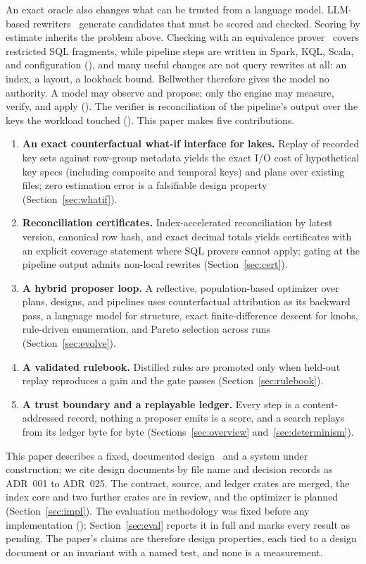 An exact oracle also changes what can be trusted from a language model.
LLM-based rewriters~\cite{genrewrite,llmr2,lithe,quite,e3rewrite,resequel}
generate candidates that must be scored and checked. Scoring by estimate
inherits the problem above. Checking with an equivalence
prover~\cite{cosette,qed,sqlsolver,verieql} covers restricted SQL fragments,
while pipeline steps are written in Spark, KQL, Scala, and configuration
(), and many useful changes are not query rewrites at all: an index, a
layout, a lookback bound. Bellwether therefore gives the model no authority. A
model may observe and propose; only the engine may measure, verify, and apply
(). The verifier is reconciliation of the pipeline's output over the
keys the workload touched (). This paper makes five contributions.

\begin{enumerate}[leftmargin=*,label=\textbf{C\arabic*}]
  \item \textbf{An exact counterfactual what-if interface for lakes.} Replay
    of recorded key sets against row-group metadata yields the exact I/O cost of
    hypothetical key specs (including composite and temporal keys) and plans
    over existing files; zero estimation error is a falsifiable design property
    (Section~\ref{sec:whatif}).
  \item \textbf{Reconciliation certificates.} Index-accelerated reconciliation
    by latest version, canonical row hash, and exact decimal totals yields
    certificates with an explicit coverage statement where SQL provers cannot
    apply; gating at the pipeline output admits non-local rewrites
    (Section~\ref{sec:cert}).
  \item \textbf{A hybrid proposer loop.} A reflective, population-based
    optimizer over plans, designs, and pipelines uses counterfactual attribution
    as its backward pass, a language model for structure, exact
    finite-difference descent for knobs, rule-driven enumeration, and Pareto
    selection across runs (Section~\ref{sec:evolve}).
  \item \textbf{A validated rulebook.} Distilled rules are promoted only when
    held-out replay reproduces a gain and the gate passes
    (Section~\ref{sec:rulebook}).
  \item \textbf{A trust boundary and a replayable ledger.} Every step is a
    content-addressed record, nothing a proposer emits is a score, and a search
    replays from its ledger byte for byte (Sections~\ref{sec:overview}
    and~\ref{sec:determinism}).
\end{enumerate}

This paper describes a fixed, documented design~\cite{bellwether} and a system
under construction; we cite design documents by file name and decision records
as ADR~001 to ADR~025. The contract, source, and ledger crates are merged, the
index core and two further crates are in review, and the optimizer is planned
(Section~\ref{sec:impl}). The evaluation methodology was fixed before any
implementation (); Section~\ref{sec:eval} reports it in full and marks
every result as pending. The paper's claims are therefore design properties,
each tied to a design document or an invariant with a named test, and none is a
measurement.

